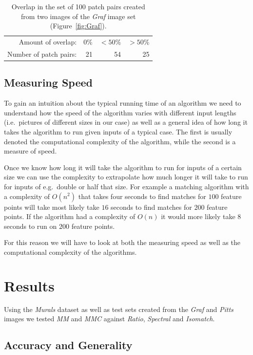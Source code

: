 \begin{table}[htb]
\caption{Overlap in the set of 100 patch pairs created from two images 
of the \emph{Graf} image set (Figure~\ref{fig:Graf}).}
\label{table:overlap}
    \centering
\begin{tabular}{r*{3}{r}}
\hline
    Amount of overlap: & 0\% & $< 50$\% & $> 50$\%  \\
    \noalign{\smallskip}
    Number of patch pairs: & 21 & 54 & 25 \\
    \hline
\end{tabular}
\end{table}

\subsection{Measuring Speed}

To gain an intuition about the typical running time of an algorithm we 
need to understand how the speed of the algorithm varies with different 
input lengths (i.e.\ pictures of different sizes in our case) as well as 
a general idea of how long it takes the algorithm to run given inputs of
a typical case. The first is usually denoted the computational 
complexity of the algorithm, while the second is a measure of speed.

Once we know how long it will take the algorithm to run for inputs of a 
certain size we can use the complexity to extrapolate how much longer it
will take to run for inputs of e.g.\ double or half that size. For 
example a matching algorithm with a complexity of $O(n^2)$ that takes 
four seconds to find matches for $100$ feature points will take most 
likely take $16$ seconds to find matches for $200$ feature points. If 
the algorithm had a complexity of $O(n)$ it would more likely take $8$ 
seconds to run on $200$ feature points.

For this reason we will have to look at both the measuring speed as well
as the computational complexity of the algorithms.

\section{Results}
\label{S:Results}

Using the \emph{Murals} dataset as well as test sets created from the 
\emph{Graf} and \emph{Pitts} images we tested \emph{MM} and \emph{MMC} 
against \emph{Ratio}, \emph{Spectral} and \emph{Isomatch}.

\subsection{Accuracy and Generality}

